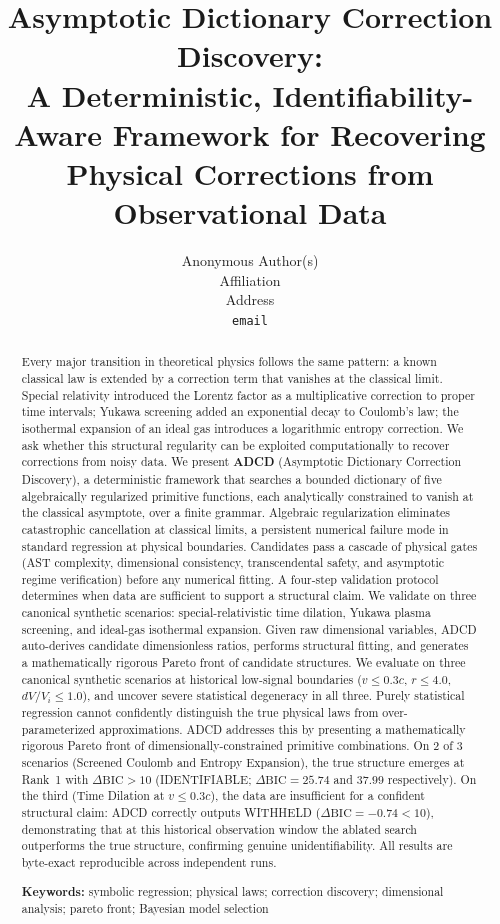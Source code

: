 ﻿\documentclass{article}
\title{Asymptotic Dictionary Correction Discovery:\\ A Deterministic, Identifiability-Aware Framework for Recovering Physical Corrections from Observational Data}
\author{%
  Anonymous Author(s) \\
  Affiliation \\
  Address \\
  \texttt{email} \\
}
\begin{document}
\maketitle

\begin{abstract}
    Every major transition in theoretical physics follows the same pattern:
    a known classical law is extended by a correction term that vanishes at the
    classical limit.
    Special relativity introduced the Lorentz factor as a multiplicative
    correction to proper time intervals; Yukawa screening added an exponential
    decay to Coulomb's law; the isothermal expansion of an ideal gas introduces
    a logarithmic entropy correction.
    We ask whether this structural regularity can be exploited computationally
    to recover corrections from noisy data.
    We present \textbf{ADCD} (Asymptotic Dictionary Correction Discovery), a
    deterministic framework that searches a bounded dictionary of five
    algebraically regularized primitive functions, each analytically constrained
    to vanish at the classical asymptote, over a finite grammar.
    Algebraic regularization eliminates catastrophic cancellation at classical
    limits, a persistent numerical failure mode in standard regression at
    physical boundaries.
    Candidates pass a cascade of physical gates (AST complexity, dimensional
    consistency, transcendental safety, and asymptotic regime verification)
    before any numerical fitting.
    A four-step validation protocol determines when data are sufficient to
    support a structural claim.
    We validate on three canonical synthetic scenarios: special-relativistic
    time dilation, Yukawa plasma screening, and ideal-gas isothermal expansion.
    Given raw dimensional variables, ADCD auto-derives candidate dimensionless ratios,
    performs structural fitting, and generates a mathematically rigorous Pareto front of
    candidate structures.
    We evaluate on three canonical synthetic scenarios at historical low-signal boundaries ($v \le 0.3c$, $r \le 4.0$, $dV/V_i \le 1.0$), and uncover severe statistical degeneracy in all three.
    Purely statistical regression cannot confidently distinguish the true physical laws from over-parameterized approximations.
    ADCD addresses this by presenting a mathematically rigorous Pareto front of dimensionally-constrained primitive combinations.
    On 2 of 3 scenarios (Screened Coulomb and Entropy Expansion), the true structure emerges at Rank~1 with $\Delta\mathrm{BIC} > 10$ (IDENTIFIABLE; $\Delta\mathrm{BIC} = 25.74$ and $37.99$ respectively).
    On the third (Time Dilation at $v \le 0.3c$), the data are insufficient for a confident structural claim: ADCD correctly outputs WITHHELD ($\Delta\mathrm{BIC} = -0.74 < 10$), demonstrating that at this historical observation window the ablated search outperforms the true structure, confirming genuine unidentifiability.
    All results are byte-exact reproducible across independent runs.

    \vspace{0.4em}
    \noindent\textbf{Keywords:} symbolic regression; physical laws;
    correction discovery; dimensional analysis; pareto front;
    Bayesian model selection
\end{abstract}
\end{document}
